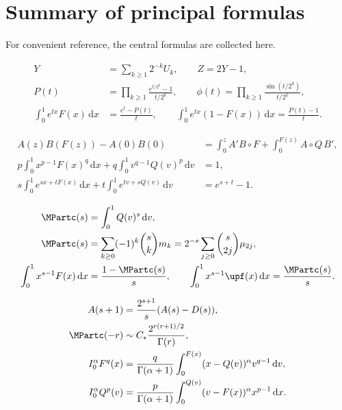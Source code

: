 \documentclass[11pt,oneside]{article}
\theoremstyle{definition}
\theoremstyle{remark}
\newcommand{\F}{F}
\newcommand{\Q}{Q}
\newcommand{\dd}{\,\mathrm d}
\newcommand{\1}{\mathbf 1}
\begin{document}
\section{Summary of principal formulas}

For convenient reference, the central formulas are collected here.

\begin{resultbox}
\begin{align*}
 Y&=\sum_{k\ge1}2^{-k}U_k,\qquad Z=2Y-1,\\
 P(t)&=\prod_{k\ge1}\frac{e^{t/2^k}-1}{t/2^k},\qquad
 \phi(t)=\prod_{k\ge1}\frac{\sin(t/2^k)}{t/2^k},\\
 \int_0^1e^{tx}\F(x)\dd x&=\frac{e^t-P(t)}t,\qquad
 \int_0^1e^{tx}(1-\F(x))\dd x=\frac{P(t)-1}t.
\end{align*}
\end{resultbox}

\begin{resultbox}
\begin{align*}
 A(z)B(\F(z))-A(0)B(0)
 &=\int_0^zA'B\circ\F
 +\int_0^{\F(z)}A\circ\Q\,B',\\
 p\int_0^1x^{p-1}\F(x)^q\dd x
 +q\int_0^1v^{q-1}\Q(v)^p\dd v&=1,\\
 s\int_0^1e^{sx+t\F(x)}\dd x
 +t\int_0^1e^{tv+s\Q(v)}\dd v&=e^{s+t}-1.
\end{align*}
\end{resultbox}

\begin{resultbox}
\begin{align*}
 \MPartc(s)&=\int_0^1\Q(v)^s\dd v,\\
 \MPartc(s)&=\sum_{k\ge0}(-1)^k\binom skm_k
 =2^{-s}\sum_{j\ge0}\binom{s}{2j}\mu_{2j},\\
 \int_0^1x^{s-1}\F(x)\dd x&=\frac{1-\MPartc(s)}s,\qquad
 \int_0^1x^{s-1}\upf(x)\dd x=\frac{\MPartc(s)}s.
\end{align*}
\end{resultbox}

\begin{resultbox}
\begin{align*}
 A(s+1)&=\frac{2^{s+1}}s(A(s)-D(s)),\\
 \MPartc(-r)&\sim C_*\frac{2^{r(r+1)/2}}{\Gamma(r)},\\
 I_0^\alpha\F^q(x)
 &=\frac{q}{\Gamma(\alpha+1)}
 \int_0^{\F(x)}(x-\Q(v))^\alpha v^{q-1}\dd v,\\
 I_0^\alpha\Q^p(v)
 &=\frac{p}{\Gamma(\alpha+1)}
 \int_0^{\Q(v)}(v-\F(x))^\alpha x^{p-1}\dd x.
\end{align*}
\end{resultbox}
\end{document}
